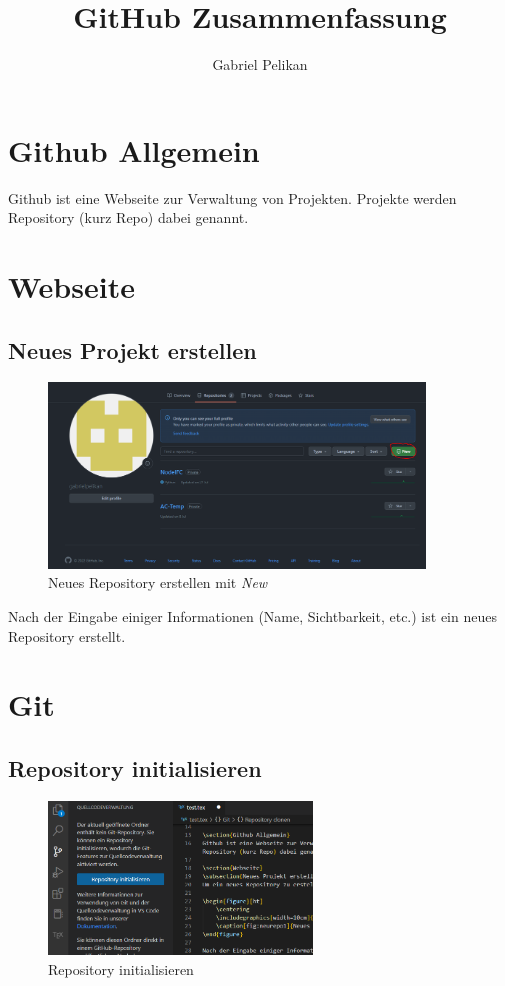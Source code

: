 \documentclass[12pt]{scrartcl}
\author{Gabriel Pelikan}
\title{GitHub Zusammenfassung}
\begin{document}
\maketitle
\tableofcontents

\section{Github Allgemein}
Github ist eine Webseite zur Verwaltung von Projekten. Projekte werden Repository (kurz Repo) dabei genannt.

\section{Webseite}
\subsection{Neues Projekt erstellen}

\begin{figure}[ht]
    \centering
    \includegraphics[width=10cm]{Neu-Repo-erstellen-1.png}
    \caption[fig:neurepo1]{Neues Repository erstellen mit \textit{New}}
\end{figure}

Nach der Eingabe einiger Informationen (Name, Sichtbarkeit, etc.) ist ein neues Repository erstellt. 

\section{Git}
\subsection{Repository initialisieren}

\begin{figure}[ht]
    \centering
    \includegraphics[width=7cm]{Repo-initialisieren.png}
    \caption[fig:repoinit1]{Repository initialisieren}
\end{figure}
\end{document}
